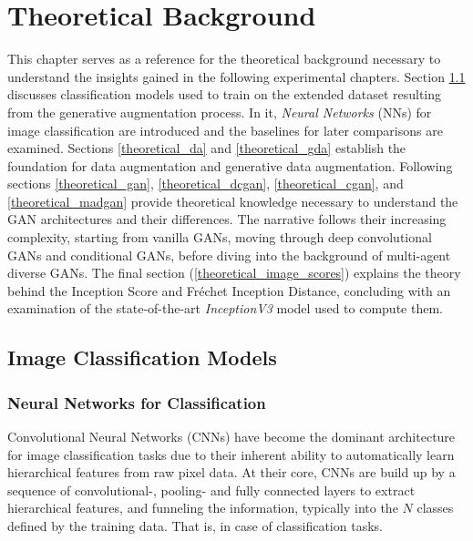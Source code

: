 \section{Theoretical Background}\label{body_theoretical_background}
This chapter serves as a reference for the theoretical background necessary to understand the insights gained in the following experimental chapters.
Section \ref{theoretical_classification} discusses classification models used to train on the extended dataset resulting from the generative augmentation process. In it, \textit{Neural Networks} (NNs) for image classification are introduced and the baselines for later comparisons are examined.
Sections \ref{theoretical_da} and \ref{theoretical_gda} establish the foundation for data augmentation and generative data augmentation.
Following sections \ref{theoretical_gan}, \ref{theoretical_dcgan}, \ref{theoretical_cgan}, and \ref{theoretical_madgan} provide theoretical knowledge necessary to understand the GAN architectures and their differences. The narrative follows their increasing complexity, starting from vanilla GANs, moving through deep convolutional GANs and conditional GANs, before diving into the background of multi-agent diverse GANs.
The final section (\ref{theoretical_image_scores}) explains the theory behind the Inception Score and Fréchet Inception Distance, concluding with an examination of the state-of-the-art \textit{InceptionV3} model used to compute them.
\subsection{Image Classification Models}\label{theoretical_classification}
\subsubsection{Neural Networks for Classification}
Convolutional Neural Networks (CNNs) have become the dominant architecture for image classification tasks due to their inherent ability to automatically learn hierarchical features from raw pixel data. At their core, CNNs are build up by a sequence of convolutional-, pooling- and fully connected layers to extract hierarchical features, and funneling the information, typically into the \(N\) classes defined by the training data. That is, in case of classification tasks.

